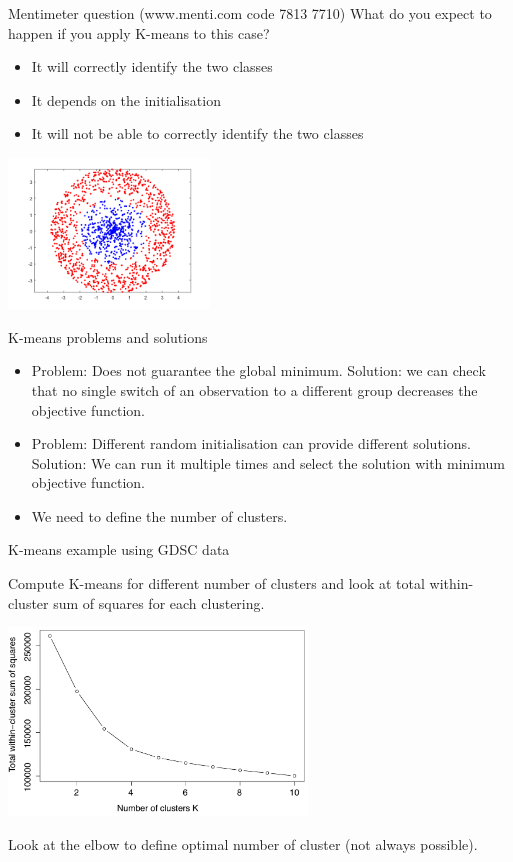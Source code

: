 \documentclass[notes]{beamer}          %
\begin{document}
\begin{frame}{Mentimeter question (www.menti.com code 7813 7710)}
What do you expect to happen if you apply K-means to this case?
\begin{itemize}
\item It will correctly identify the two classes
\item It depends on the initialisation
\item It will not be able to correctly identify the two classes
\end{itemize}
\begin{center}
\includegraphics[height=4cm]{../figures/week_6/nonseparableclass.png}  
\end{center}
\end{frame}

\begin{frame}{K-means problems and solutions}
\begin{itemize}
 \item Problem: Does not guarantee the global minimum. Solution: we can check that no single switch of an observation to a different group decreases the objective function.
 \item Problem: Different random initialisation can provide different solutions. Solution: We can run it multiple times and select the solution with minimum objective function.
 \item We need to define the number of clusters.
\end{itemize}
\end{frame}

\begin{frame}{K-means example using GDSC data}

Compute K-means for different number of clusters and look at total within-cluster sum of squares for each clustering. 
\begin{center}
\includegraphics[height=5cm]{../figures/week_6/Kmeans_differentclustersize.pdf}  
\end{center}
Look at the elbow to define optimal number of cluster (not always possible).
\end{frame}
\end{document}
